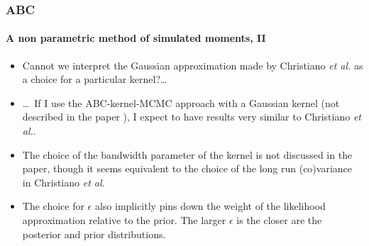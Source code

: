 \documentclass[10pt]{beamer}
\begin{document}
\begin{frame}
  \frametitle{ABC}
  \framesubtitle{A non parametric method of simulated  moments, II}

  \bigskip
  
  \begin{itemize}
    
  \item Cannot we interpret the Gaussian approximation made by
    Christiano \textit{et al.} as a choice for a particular kernel?\dots\newline

  \item \dots\ If I use the ABC-kernel-MCMC approach with a Gaussian
    kernel (not described in the paper ), I expect to have results
    very similar to Christiano \textit{et al.}.\newline

  \item The choice of the bandwidth parameter of the kernel is not
    discussed in the paper, though it seems equivalent to the choice of the
    long run (co)variance in Christiano \emph{et al.}\newline

  \item The choice for $\epsilon$ also implicitly pins down the weight of
    the likelihood approximation relative to the prior. The larger
    $\epsilon$ is the closer are the posterior and prior
    distributions.

  \end{itemize}
\end{frame}
\end{document}
